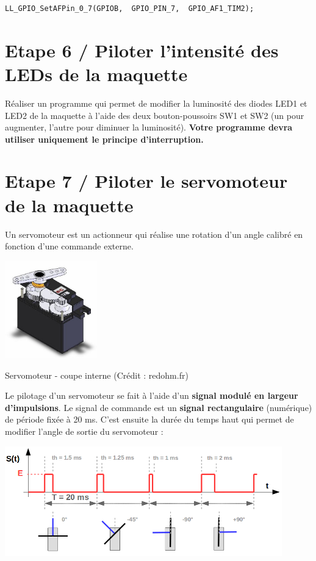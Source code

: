 \documentclass[a4paper,11pt,titlepage]{article} %
\begin{document}
\begin{lstlisting}
LL_GPIO_SetAFPin_0_7(GPIOB,  GPIO_PIN_7,  GPIO_AF1_TIM2);
\end{lstlisting}


\section{Etape 6 / Piloter l'intensité des LEDs de la maquette}

\Manip Réaliser un programme qui permet de modifier la luminosité des diodes LED1 et LED2 de la maquette à l'aide des deux bouton-poussoirs SW1 et SW2 (un pour augmenter, l'autre pour diminuer la luminosité). \textbf{Votre programme devra utiliser uniquement le principe d'interruption.}

\newpage
\section{Etape 7 / Piloter le servomoteur de la maquette}

Un servomoteur est un actionneur qui réalise une rotation d'un angle calibré en fonction d'une commande externe.

\begin{center}
	\includegraphics[width=0.3\textwidth]{images/MINE_Nucleo_servomoteur-redohm.jpg}
	
	Servomoteur - coupe interne (Crédit : redohm.fr)
\end{center}

Le pilotage d'un servomoteur se fait à l'aide d'un \textbf{signal modulé en largeur d'impulsions}. Le signal de commande est un \textbf{signal rectangulaire} (numérique) de période fixée à 20 ms. C'est ensuite la durée du temps haut qui permet de modifier l'angle de sortie du servomoteur :

\begin{center}
	\includegraphics[width=0.9\textwidth]{images/MINE_Nucleo_servomoteur.png}
\end{center}
\end{document}
